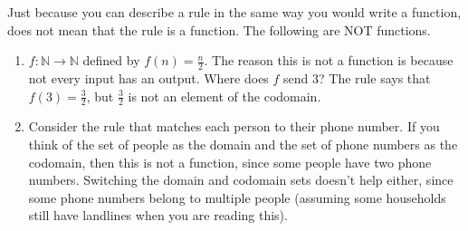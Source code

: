 \documentclass[11pt, compress]{beamer}
\newcommand{\N}{\mathbb N}
\begin{document}
\begin{frame}
\frametitle{}
\begin{example}[0.4.2]Just because you can describe a rule in the same way you would write a function, does not mean that the rule is a function. The following are NOT functions.
\pause 

\begin{enumerate}[<+->]
\item{} \(f:\N \to \N\) defined by \(f(n) = \frac{n}{2}\). The reason this is not a function is because not every input has an output. Where does \(f\) send 3? The rule says that \(f(3) = \frac{3}{2}\), but \(\frac{3}{2}\) is not an element of the codomain.


\item{} Consider the rule that matches each person to their phone number. If you think of the set of people as the domain and the set of phone numbers as the codomain, then this is not a function, since some people have two phone numbers. Switching the domain and codomain sets doesn't help either, since some phone numbers belong to multiple people (assuming some households still have landlines when you are reading this).

\end{enumerate}

\end{example}
\end{frame}
 
\end{document}
